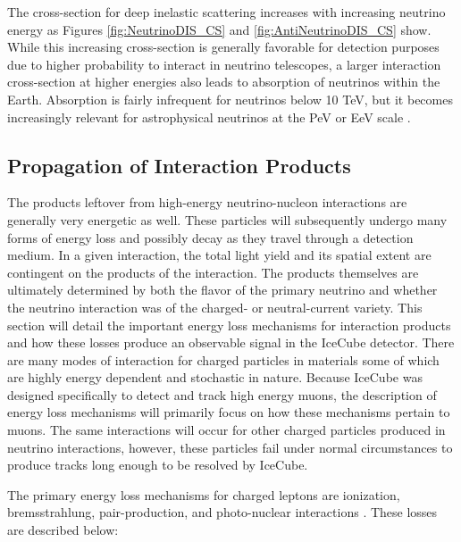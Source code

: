 \documentclass{gatech-thesis}
\begin{document}
The cross-section for deep inelastic scattering increases with increasing neutrino energy as Figures \ref{fig:NeutrinoDIS_CS} and \ref{fig:AntiNeutrinoDIS_CS} show. While this increasing cross-section is generally favorable for detection purposes due to higher probability to interact in neutrino telescopes, a larger interaction cross-section at higher energies also leads to absorption of neutrinos within the Earth. Absorption is fairly infrequent for neutrinos below 10 TeV, but it becomes increasingly relevant for astrophysical neutrinos at the PeV or EeV scale \cite{2013arXiv1304.4891K}.

\subsection{Propagation of Interaction Products}
The products leftover from high-energy neutrino-nucleon interactions are generally very energetic as well. These particles will subsequently undergo many forms of energy loss and possibly decay as they travel through a detection medium. In a given interaction, the total light yield and its spatial extent are contingent on the products of the interaction. The products themselves are ultimately determined by both the flavor of the primary neutrino and whether the neutrino interaction was of the charged- or neutral-current variety. This section will detail the important energy loss mechanisms for interaction products and how these losses produce an observable signal in the IceCube detector. There are many modes of interaction for charged particles in materials some of which are highly energy dependent and stochastic in nature. Because IceCube was designed specifically to detect and track high energy muons, the description of energy loss mechanisms will primarily focus on how these mechanisms pertain to muons. The same interactions will occur for other charged particles produced in neutrino interactions, however, these particles fail under normal circumstances to produce tracks long enough to be resolved by IceCube.

The primary energy loss mechanisms for charged leptons are ionization, bremsstrahlung, pair-production, and photo-nuclear interactions \cite{2001PhRvD..63i4020I}. These losses are described below:
\end{document}
